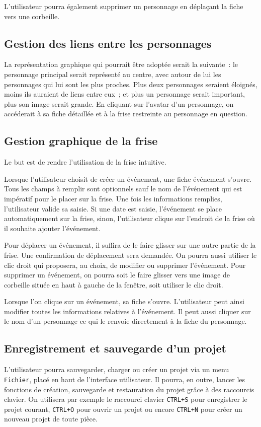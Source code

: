 \documentclass[a4paper,11pt,twoside]{article}
\begin{document}
L'utilisateur pourra également supprimer un personnage en déplaçant la fiche vers une corbeille.

\subsection{Gestion des liens entre les personnages}
La représentation graphique qui pourrait être adoptée serait la suivante~: le personnage principal serait représenté au centre, avec autour de lui les personnages qui lui sont les plus proches. Plus deux personnages seraient éloignés, moins ils auraient de liens entre eux~; et plus un personnage serait important, plus son image serait grande. En cliquant sur l'avatar d'un personnage, on accéderait à sa fiche détaillée et à la frise restreinte au personnage en question. 

\subsection{Gestion graphique de la frise}
Le but est de rendre l'utilisation de la frise intuitive.

Lorsque l'utilisateur choisit de créer un événement, une fiche événement s'ouvre. Tous les champs à remplir sont optionnels sauf le nom de l'événement qui est impératif pour le placer sur la frise. Une fois les informations remplies, l'utilisateur valide sa saisie. Si une date est saisie, l'événement se place automatiquement sur la frise, sinon, l'utilisateur clique sur l'endroit de la frise où il souhaite ajouter l'événement.

Pour déplacer un événement, il suffira de le faire glisser sur une autre partie de la frise. Une confirmation de déplacement sera demandée. On pourra aussi utiliser le clic droit qui proposera, au choix, de modifier ou supprimer l'événement. Pour supprimer un événement, on pourra soit le faire glisser vers une image de corbeille située en haut à gauche de la fenêtre, soit utiliser le clic droit.

Lorsque l'on clique sur un événement, sa fiche s'ouvre. L'utilisateur peut ainsi modifier toutes les informations relatives à l'événement. Il peut aussi cliquer sur le nom d'un personnage ce qui le renvoie directement à la fiche du personnage.

\subsection{Enregistrement et sauvegarde d'un projet}
L'utilisateur pourra sauvegarder, charger ou créer un projet via un menu \texttt{Fichier}, placé en haut de l'interface utilisateur. Il pourra, en outre, lancer les fonctions de création, sauvegarde et restauration du projet grâce à des raccourcis clavier. On utilisera par exemple le raccourci clavier \verb"CTRL+S" pour enregistrer le projet courant, \verb"CTRL+O" pour ouvrir un projet ou encore \verb"CTRL+N" pour créer un nouveau projet de toute pièce.
\end{document}
